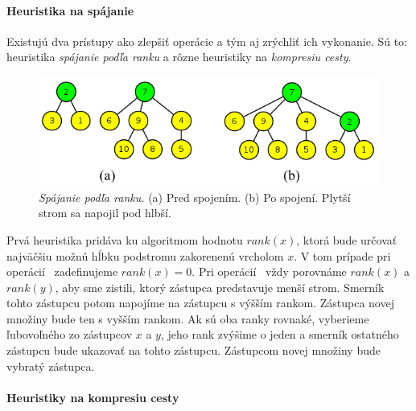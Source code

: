 \paragraph{Heuristika na spájanie}
Existujú dva prístupy ako zlepšiť operácie a tým aj zrýchliť ich vykonanie. 
Sú to: heuristika \emph{spájanie podľa ranku} a rôzne heuristiky na 
\emph{kompresiu cesty}. 

\begin{figure}
\includegraphics[width=\columnwidth]{obrazky/union.png}
\caption{\emph{Spájanie podľa ranku.} (a) Pred spojením. (b) Po spojení. 
Plytší strom sa napojil pod hlbší.} 
\label{img:union} 
\end{figure}

Prvá heuristika pridáva ku algoritmom hodnotu 
$rank(x)$, ktorá bude určovať najväčšiu možnú hĺbku podstromu zakorenenú 
vrcholom $x$. V tom prípade pri o\-pe\-rá\-cií \makeset\ zadefinujeme 
$rank(x) = 0$. 
Pri o\-pe\-rá\-cií \union\ vždy porovnáme $rank(x)$ a $rank(y)$, aby sme zistili, 
ktorý zástupca predstavuje menší strom. Smerník tohto zástupcu potom napojíme 
na zástupcu s výšším rankom. Zástupca novej množiny bude ten s vyšším rankom. 
Ak sú oba ranky rovnaké, vyberieme ľubovoľného zo zástupcov $x$ a $y$, 
jeho rank zvýšime o jeden a smerník ostatného zástupcu bude ukazovať 
na tohto zástupcu. Zástupcom novej množiny bude vybratý zástupca. 

\paragraph{Heuristiky na kompresiu cesty}


